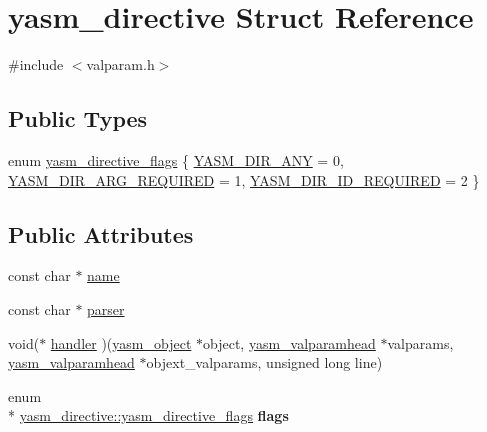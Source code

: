 \hypertarget{structyasm__directive}{\section{yasm\-\_\-directive Struct Reference}
\label{structyasm__directive}
}


{\ttfamily \#include $<$valparam.\-h$>$}

\subsection*{Public Types}
\begin{DoxyCompactItemize}
\item 
enum \hyperlink{structyasm__directive_af2d4bb52875d377ffd49e76515515104}{yasm\-\_\-directive\-\_\-flags} \{ \hyperlink{structyasm__directive_af2d4bb52875d377ffd49e76515515104a2d9cd720cb508f763d526f1b2ae6c567}{Y\-A\-S\-M\-\_\-\-D\-I\-R\-\_\-\-A\-N\-Y} = 0, 
\hyperlink{structyasm__directive_af2d4bb52875d377ffd49e76515515104a4ab4fae10f559eb32c752f28b737fabc}{Y\-A\-S\-M\-\_\-\-D\-I\-R\-\_\-\-A\-R\-G\-\_\-\-R\-E\-Q\-U\-I\-R\-E\-D} = 1, 
\hyperlink{structyasm__directive_af2d4bb52875d377ffd49e76515515104a14de6cfbb5d759ebe8048bd7328c4715}{Y\-A\-S\-M\-\_\-\-D\-I\-R\-\_\-\-I\-D\-\_\-\-R\-E\-Q\-U\-I\-R\-E\-D} = 2
 \}
\end{DoxyCompactItemize}
\subsection*{Public Attributes}
\begin{DoxyCompactItemize}
\item 
const char $\ast$ \hyperlink{structyasm__directive_a8d0102af38d39ebef49b1116cb995afb}{name}
\item 
const char $\ast$ \hyperlink{structyasm__directive_ae6c761eb5d0243cb1a467d69700557bc}{parser}
\item 
void($\ast$ \hyperlink{structyasm__directive_a4a30e72975467a1d258908adb6d01c7f}{handler} )(\hyperlink{structyasm__object}{yasm\-\_\-object} $\ast$object, \hyperlink{coretype_8h_ab1c6ed70512ed01b56479b23e5ece9bc}{yasm\-\_\-valparamhead} $\ast$valparams, \hyperlink{coretype_8h_ab1c6ed70512ed01b56479b23e5ece9bc}{yasm\-\_\-valparamhead} $\ast$objext\-\_\-valparams, unsigned long line)
\item 
\hypertarget{structyasm__directive_a8af7f0c711c25221ae820dab6610759c}{enum \\*
\hyperlink{structyasm__directive_af2d4bb52875d377ffd49e76515515104}{yasm\-\_\-directive\-::yasm\-\_\-directive\-\_\-flags} {\bfseries flags}}\label{structyasm__directive_a8af7f0c711c25221ae820dab6610759c}

\end{DoxyCompactItemize}


